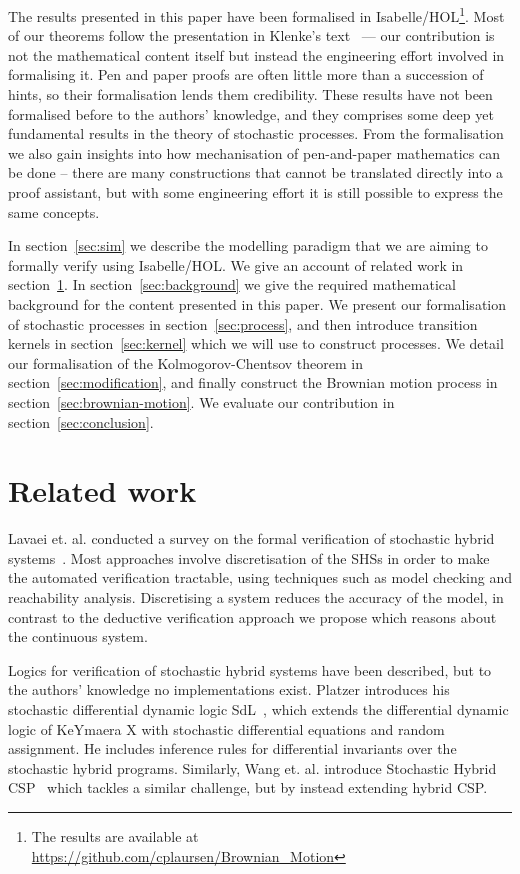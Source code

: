 \documentclass[orivec, envcountsame]{llncs}
\begin{document}
The results presented in this paper have been formalised in Isabelle/HOL\footnote{The results are available at \url{https://github.com/cplaursen/Brownian_Motion}}. Most of our theorems follow the presentation in Klenke's text~\cite{klenke20} --- our contribution is not the mathematical content itself but instead the engineering effort involved in formalising it. Pen and paper proofs are often little more than a succession of hints, so their formalisation lends them credibility. These results have not been formalised before to the authors' knowledge, and they comprises some deep yet fundamental results in the theory of stochastic processes. From the formalisation we also gain insights into how mechanisation of pen-and-paper mathematics can be done -- there are many constructions that cannot be translated directly into a proof assistant, but with some engineering effort it is still possible to express the same concepts.

In section~\ref{sec:sim} we describe the modelling paradigm that we are aiming to formally verify using Isabelle/HOL. We give an account of related work in section~\ref{sec:related-work}. In section~\ref{sec:background} we give the required mathematical background for the content presented in this paper. We present our formalisation of stochastic processes in section~\ref{sec:process}, and then introduce transition kernels in section~\ref{sec:kernel} which we will use to construct processes. We detail our formalisation of the Kolmogorov-Chentsov theorem in section~\ref{sec:modification}, and finally construct the Brownian motion process in section~\ref{sec:brownian-motion}. We evaluate our contribution in section~\ref{sec:conclusion}.

\section{Related work}\label{sec:related-work}
Lavaei et. al. conducted a survey on the formal verification of stochastic hybrid systems~\cite{lavaei21}. Most approaches involve discretisation of the SHSs in order to make the automated verification tractable, using techniques such as model checking and reachability analysis. Discretising a system reduces the accuracy of the model, in contrast to the deductive verification approach we propose which reasons about the continuous system.

Logics for verification of stochastic hybrid systems have been described, but to the authors' knowledge no implementations exist. Platzer introduces his stochastic differential dynamic logic SdL~\cite{platzer11}, which extends the differential dynamic logic of KeYmaera X with stochastic differential equations and random assignment. He includes inference rules for differential invariants over the stochastic hybrid programs. Similarly, Wang et. al. introduce Stochastic Hybrid CSP~\cite{wang17} which tackles a similar challenge, but by instead extending hybrid CSP.
\end{document}
